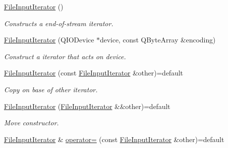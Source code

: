 \begin{DoxyCompactItemize}
\item 
\hyperlink{struct_mdt_1_1_plain_text_1_1_file_input_iterator_a53ed659924fc406bd89c6c6f04018159}{File\+Input\+Iterator} ()\hypertarget{struct_mdt_1_1_plain_text_1_1_file_input_iterator_a53ed659924fc406bd89c6c6f04018159}{}\label{struct_mdt_1_1_plain_text_1_1_file_input_iterator_a53ed659924fc406bd89c6c6f04018159}

\begin{DoxyCompactList}\small\item\em Constructs a end-\/of-\/stream iterator. \end{DoxyCompactList}\item 
\hyperlink{struct_mdt_1_1_plain_text_1_1_file_input_iterator_ad34d8fff6203f66a4e78283c30079a8f}{File\+Input\+Iterator} (Q\+I\+O\+Device $\ast$device, const Q\+Byte\+Array \&encoding)
\begin{DoxyCompactList}\small\item\em Construct a iterator that acts on device. \end{DoxyCompactList}\item 
\hyperlink{struct_mdt_1_1_plain_text_1_1_file_input_iterator_a7cba55a1d994d46dcddd36dcbf79381b}{File\+Input\+Iterator} (const \hyperlink{struct_mdt_1_1_plain_text_1_1_file_input_iterator}{File\+Input\+Iterator} \&other)=default\hypertarget{struct_mdt_1_1_plain_text_1_1_file_input_iterator_a7cba55a1d994d46dcddd36dcbf79381b}{}\label{struct_mdt_1_1_plain_text_1_1_file_input_iterator_a7cba55a1d994d46dcddd36dcbf79381b}

\begin{DoxyCompactList}\small\item\em Copy on base of other iterator. \end{DoxyCompactList}\item 
\hyperlink{struct_mdt_1_1_plain_text_1_1_file_input_iterator_aa3921f03022ead216ef23e27aae1ea69}{File\+Input\+Iterator} (\hyperlink{struct_mdt_1_1_plain_text_1_1_file_input_iterator}{File\+Input\+Iterator} \&\&other)=default\hypertarget{struct_mdt_1_1_plain_text_1_1_file_input_iterator_aa3921f03022ead216ef23e27aae1ea69}{}\label{struct_mdt_1_1_plain_text_1_1_file_input_iterator_aa3921f03022ead216ef23e27aae1ea69}

\begin{DoxyCompactList}\small\item\em Move constructor. \end{DoxyCompactList}\item 
\hyperlink{struct_mdt_1_1_plain_text_1_1_file_input_iterator}{File\+Input\+Iterator} \& \hyperlink{struct_mdt_1_1_plain_text_1_1_file_input_iterator_adc29c4e6d155d676ca78d1f5ab8032f0}{operator=} (const \hyperlink{struct_mdt_1_1_plain_text_1_1_file_input_iterator}{File\+Input\+Iterator} \&other)=default\hypertarget{struct_mdt_1_1_plain_text_1_1_file_input_iterator_adc29c4e6d155d676ca78d1f5ab8032f0}{}\label{struct_mdt_1_1_plain_text_1_1_file_input_iterator_adc29c4e6d155d676ca78d1f5ab8032f0}


\end{DoxyCompactItemize}
